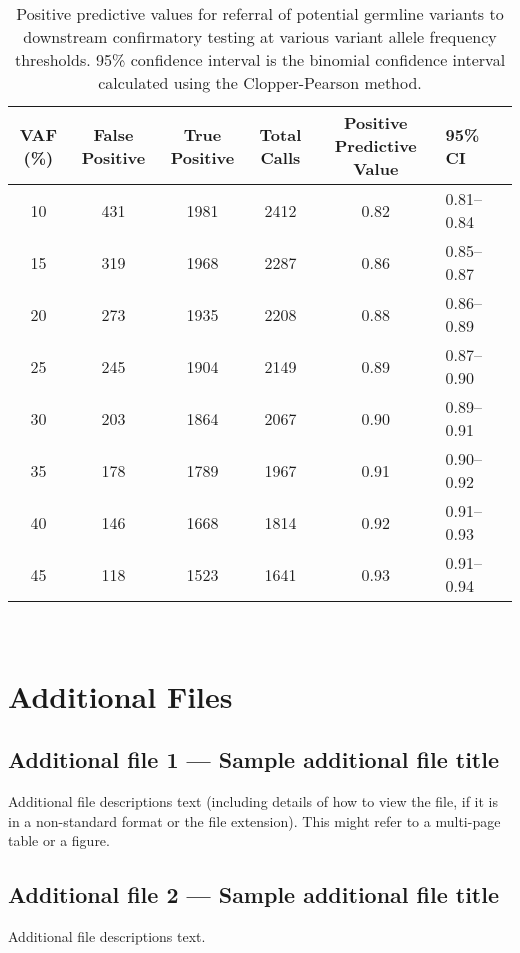 \documentclass{bmcart}
\begin{document}
\begin{backmatter}
\begin{table}[H]
\caption[Positive predictive values for referral of potential germline variants to downstream confirmatory testing at various variant allele frequency thresholds.]{Positive predictive values for referral of potential germline variants to downstream confirmatory testing at various variant allele frequency thresholds. 95\% confidence interval is the binomial confidence interval calculated using the Clopper-Pearson method.}
\label{ppv}
\centering
      \begin{tabular}{cccccll}
        \hline
        VAF (\%) & False Positive & True Positive & Total Calls & Positive Predictive Value & 95\% CI
        \\
        \hline
        10 & 431 & 1981 & 2412 & 0.82 & 0.81--0.84
        \\
        15 & 319 & 1968 & 2287 & 0.86 & 0.85--0.87
        \\
        20 & 273 & 1935 & 2208 & 0.88 & 0.86--0.89
        \\
        25 & 245 & 1904 & 2149 & 0.89 & 0.87--0.90
        \\
        30 & 203 & 1864 & 2067 & 0.90 & 0.89--0.91
        \\
        35 & 178 & 1789 & 1967 & 0.91 & 0.90--0.92
        \\
        40 & 146 & 1668 & 1814 & 0.92 & 0.91--0.93
        \\
        45 & 118 & 1523 & 1641 & 0.93 & 0.91--0.94
        \\
				\hline
      \end{tabular} \\
\end{table}




\section*{Additional Files}
  \subsection*{Additional file 1 --- Sample additional file title}
    Additional file descriptions text (including details of how to
    view the file, if it is in a non-standard format or the file extension).  This might
    refer to a multi-page table or a figure.

  \subsection*{Additional file 2 --- Sample additional file title}
    Additional file descriptions text.


\end{backmatter}
\end{document}
